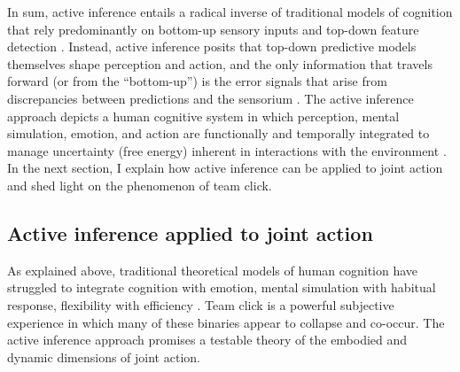 \begin{CJK}{UTF8}{gbsn}

In sum, active inference \citep[and the predictive coding paradigm which it extends, see][]{Clark2013} entails a radical inverse of traditional models of cognition that rely predominantly on bottom-up sensory inputs and top-down feature detection \citep[e.g.,][]{Marr1985}. Instead, active inference posits that top-down predictive models themselves shape perception and action, and the only information that travels forward (or from the ``bottom-up'') is the error signals that arise from discrepancies between predictions and the sensorium \citep{Pickering2014}.  The active inference approach depicts a human cognitive system in which perception, mental simulation, emotion, and action are functionally and temporally integrated to manage uncertainty (free energy) inherent in interactions with the environment \citep{Clark2013}.  In the next section, I explain how active inference can be applied to joint action and shed light on the phenomenon of team click.






























\subsection{Active inference applied to joint action \label{sect:activeInfJA}}

As explained above, traditional theoretical models of human cognition have struggled to integrate cognition with emotion, mental simulation with habitual response, flexibility with efficiency \citep{Clark2015}.
Team click is a powerful subjective experience in which many of these binaries appear to collapse and co-occur.  The active inference approach promises a testable theory of the embodied and dynamic dimensions of joint action.


\end{CJK}
